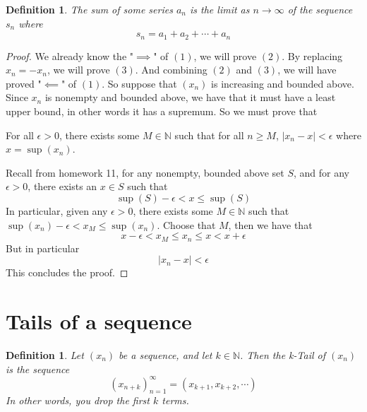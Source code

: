 \documentclass{article}
\newtheorem{definition}[theorem]{Definition}
\newtheorem{one minute paper}[theorem]{One Minute Paper}
\begin{document}
\begin{definition}
    The sum of some series $a_n$ is the limit as $n \rightarrow \infty$ of the sequence $s_n$ where 
    \begin{equation}
        s_n = a_1 + a_2 + \cdots + a_n
    \end{equation}
\end{definition}

\begin{proof}
    We already know the "$\implies$" of $(1)$, we will prove $(2)$. By replacing $x_n = -x_n$, we will prove $(3)$. And combining $(2)$ and $(3)$, we will have proved "$\impliedby$" of $(1)$. So suppose that $(x_n)$ is increasing and bounded above. Since $x_n$ is nonempty and bounded above, we have that it must have a least upper bound, in other words it has a supremum. So we must prove that
    \begin{center}
        For all $\epsilon > 0$, there exists some $M \in \mathbb{N}$ such that for all $n \geq M$, $|x_n - x| < \epsilon$ where $x = \sup(x_n)$.
    \end{center}
    Recall from homework 11, for any nonempty, bounded above set $S$, and for any $\epsilon > 0$, there exists an $x \in S$ such that 
    \begin{equation}
        \sup(S) - \epsilon < x \leq \sup(S)
    \end{equation}
    In particular, given any $\epsilon > 0$, there exists some $M \in \mathbb{N}$ such that $\sup(x_n) - \epsilon < x_M \leq \sup(x_n)$. Choose that $M$, then we have that 
    \begin{equation}
        x - \epsilon < x_M \leq x_n \leq x < x + \epsilon
    \end{equation}
    But in particular
    \begin{equation}
        |x_n - x| < \epsilon
    \end{equation}
    This concludes the proof. 
\end{proof}

\section*{Tails of a sequence}

\begin{definition}
    Let $(x_n)$ be a sequence, and let $k \in \mathbb{N}$. Then the k-Tail of $(x_n)$ is the sequence 
    \begin{equation}
        (x_{n+k})_{n=1}^{\infty} = (x_{k+1}, x_{k+2}, \cdots)
    \end{equation}
    In other words, you drop the first $k$ terms. 
\end{definition}
\end{document}
